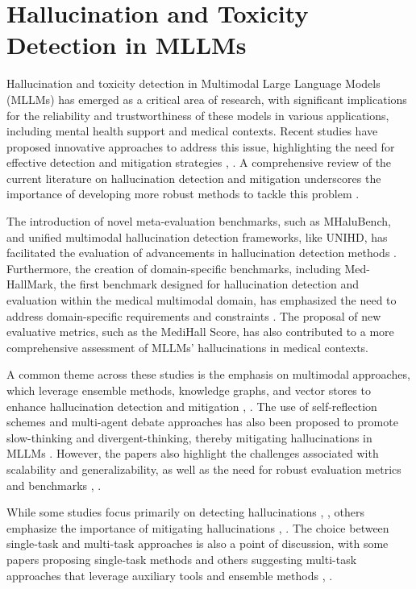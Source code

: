 \documentclass[conference]{IEEEtran}
\begin{document}
\section{Hallucination and Toxicity Detection in MLLMs}
Hallucination and toxicity detection in Multimodal Large Language Models (MLLMs) has emerged as a critical area of research, with significant implications for the reliability and trustworthiness of these models in various applications, including mental health support and medical contexts. Recent studies have proposed innovative approaches to address this issue, highlighting the need for effective detection and mitigation strategies \cite{b1}, \cite{b2}. A comprehensive review of the current literature on hallucination detection and mitigation underscores the importance of developing more robust methods to tackle this problem \cite{b3}. 

The introduction of novel meta-evaluation benchmarks, such as MHaluBench, and unified multimodal hallucination detection frameworks, like UNIHD, has facilitated the evaluation of advancements in hallucination detection methods \cite{b4}. Furthermore, the creation of domain-specific benchmarks, including Med-HallMark, the first benchmark designed for hallucination detection and evaluation within the medical multimodal domain, has emphasized the need to address domain-specific requirements and constraints \cite{b5}. The proposal of new evaluative metrics, such as the MediHall Score, has also contributed to a more comprehensive assessment of MLLMs' hallucinations in medical contexts.

A common theme across these studies is the emphasis on multimodal approaches, which leverage ensemble methods, knowledge graphs, and vector stores to enhance hallucination detection and mitigation \cite{b2}, \cite{b4}. The use of self-reflection schemes and multi-agent debate approaches has also been proposed to promote slow-thinking and divergent-thinking, thereby mitigating hallucinations in MLLMs \cite{b1}. However, the papers also highlight the challenges associated with scalability and generalizability, as well as the need for robust evaluation metrics and benchmarks \cite{b3}, \cite{b4}.

While some studies focus primarily on detecting hallucinations \cite{b3}, \cite{b4}, others emphasize the importance of mitigating hallucinations \cite{b1}, \cite{b2}. The choice between single-task and multi-task approaches is also a point of discussion, with some papers proposing single-task methods \cite{b3} and others suggesting multi-task approaches that leverage auxiliary tools and ensemble methods \cite{b4}, \cite{b5}. 
\end{document}
